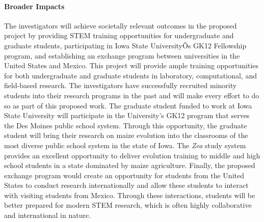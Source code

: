 \paragraph{Broader Impacts}

The investigators will achieve societally relevant outcomes in the proposed project by providing STEM training opportunities for undergraduate and graduate students, participating in Iowa State UniversityÕs GK12 Fellowship program, and establishing an exchange program between universities in the United States and Mexico. This project will provide ample training opportunities for both undergraduate and graduate students in laboratory, computational, and field-based research. The investigators have successfully recruited minority students into their research programs in the past and will make every effort to do so as part of this proposed work. The graduate student funded to work at Iowa State University will participate in the University's GK12 program that serves the Des Moines public school system. Through this opportunity, the graduate student will bring their research on maize evolution into the classrooms of the most diverse public school system in the state of Iowa. The \emph{Zea} study system provides an excellent opportunity to deliver evolution training to middle and high school students in a state dominated by maize agriculture. Finally, the proposed exchange program would create an opportunity for students from the United States to conduct research internationally and allow these students to interact with visiting students from Mexico. Through these interactions, students will be better prepared for modern STEM research, which is often highly collaborative and international in nature.

